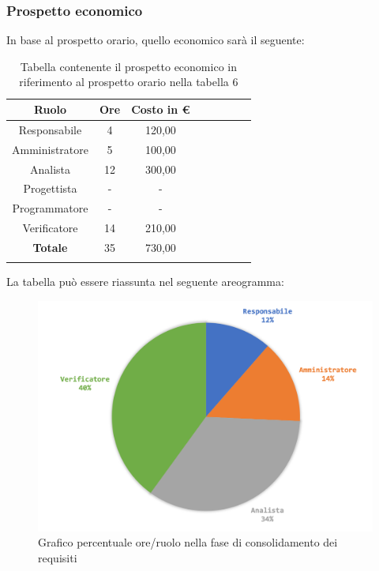 		\subsubsection{Prospetto economico}
		In base al prospetto orario, quello economico sarà il seguente: 
		
			\begin{longtable}{|c|c|c|c|c|c|c|c|}
				\hline
				\rowcolor{lighter-grayer}
				\textbf{Ruolo} & \textbf{Ore} & \textbf{Costo in €} \\
				\hline
				\endfirsthead
				
				\hline
				Responsabile & 4 & 120,00\\
				\hline
				\hline
				Amministratore & 5 & 100,00\\
				\hline
				\hline
				Analista & 12 & 300,00\\
				\hline
				\hline
				Progettista & - & -\\
				\hline
				\hline
				Programmatore & -  & -\\
				\hline
				\hline
				Verificatore & 14 & 210,00\\
				\hline
				\textbf{Totale} & 35 & 730,00\\
				\hline
				\caption{Tabella contenente il prospetto economico in riferimento al prospetto orario nella tabella 6}
			\end{longtable}
			\pagebreak
			
			La tabella può essere riassunta nel seguente areogramma:
			\begin{figure}[H]
				\centering
				\includegraphics[width=0.8\linewidth]{./images/preventivo/consRequisiti2.png}
				\caption{Grafico percentuale ore/ruolo nella fase di consolidamento dei requisiti}
				\label{fig:grafico costi ruolo fase consolidamento dei requisiti}
			\end{figure}
	

